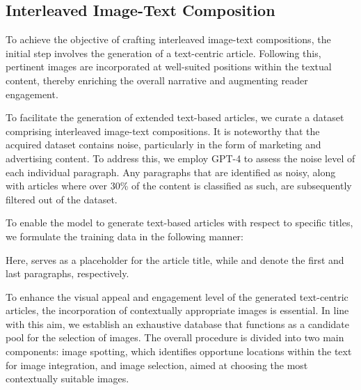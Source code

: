 \documentclass[10pt,twocolumn,letterpaper]{article}
\begin{document}
\subsection{Interleaved Image-Text Composition}
\label{sec:compos_data}
To achieve the objective of crafting interleaved image-text compositions, the initial step involves the generation of a text-centric article. Following this, pertinent images are incorporated at well-suited positions within the textual content, thereby enriching the overall narrative and augmenting reader engagement.

 To facilitate the generation of extended text-based articles, we curate a dataset comprising interleaved image-text compositions. It is noteworthy that the acquired dataset contains noise, particularly in the form of marketing and advertising content. To address this, we employ GPT-4 to assess the noise level of each individual paragraph. Any paragraphs that are identified as noisy, along with articles where over 30\% of the content is classified as such, are subsequently filtered out of the dataset.

To enable the model to generate text-based articles with respect to specific titles, we formulate the training data in the following manner:

Here,  serves as a placeholder for the article title, while  and  denote the first and last paragraphs, respectively. 

To enhance the visual appeal and engagement level of the generated text-centric articles, the incorporation of contextually appropriate images is essential. In line with this aim, we establish an exhaustive database that functions as a candidate pool for the selection of images. The overall procedure is divided into two main components: image spotting, which identifies opportune locations within the text for image integration, and image selection, aimed at choosing the most contextually suitable images. 
\end{document}
